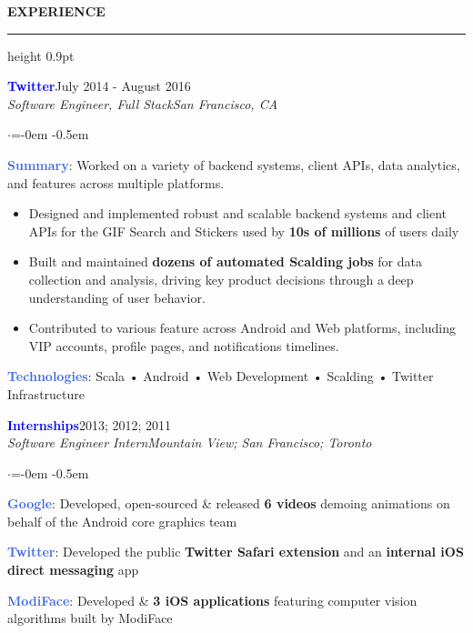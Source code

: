 \documentclass[
    11pt, %
]{resume} %
\newenvironment{rSectionCustom}[1]{
  \Large
  \sectionskip
  \textbf{\textcolor{Cerulean}{\MakeUppercase{#1}}}
  \vspace{0.5em}
  {\color{Blue}\hrule height 0.9pt}
  \vspace{0.25em}

  \begin{list}{}{
    \setlength{\leftmargin}{1.5em}
  }
  \item[]
}{
    \vspace{1em}
    \end{list}
}
\newenvironment{rSubsection2}[4]{
  \normalsize
  \hspace{-18pt}\textcolor{Blue}{\textbf{\large #1}}\hfill{#2}
  \\
  \hspace*{-18pt}\emph{#3}\hfill\emph{#4}
  \begin{list}{$\cdot$}{\leftmargin=-0em}
  \itemsep -0.5em \vspace{-0.25em}
}{
    \vspace{1em}
    \end{list}
}
\begin{document}
\begin{rSectionCustom}{Experience}
    \begin{rSubsection2}{Twitter}{July 2014 - August 2016}{Software Engineer, Full Stack}{San Francisco, CA}
        \item[] \textcolor{RoyalBlue}{\textbf{Summary}}: Worked on a variety of backend systems, client APIs, data analytics, and features across multiple platforms.
        \begin{itemize}[leftmargin=*]
            \item Designed and implemented robust and scalable backend systems and client APIs for the GIF Search and Stickers used by \textbf{10s of millions} of users daily
            \item Built and maintained \textbf{dozens of automated Scalding jobs} for data collection and analysis, driving key product decisions through a deep understanding of user behavior.
            \item Contributed to various feature across Android and Web platforms, including VIP accounts, profile pages, and notifications timelines.
            \end{itemize}
        \vspace{0.5em}
        \item[] \textcolor{RoyalBlue}{\textbf{Technologies}}: Scala • Android • Web Development • Scalding • Twitter Infrastructure
    \end{rSubsection2}

    \begin{rSubsection2}{Internships}{2013; 2012; 2011}{Software Engineer Intern}{Mountain View; San Francisco; Toronto}
        \item[] \textcolor{RoyalBlue}{\textbf{Google}}: Developed, open-sourced \& released \textbf{6 videos} demoing animations on behalf of the Android core graphics team
        \item[] \textcolor{RoyalBlue}{\textbf{Twitter}}: Developed the public \textbf{Twitter Safari extension} and an \textbf{internal iOS direct messaging}  app
        \item[] \textcolor{RoyalBlue}{\textbf{ModiFace}}: Developed & \released \textbf{3 iOS applications} featuring computer vision algorithms built by ModiFace
    \end{rSubsection2}



\end{rSectionCustom}

\vspace{-1.5em}
\end{document}
